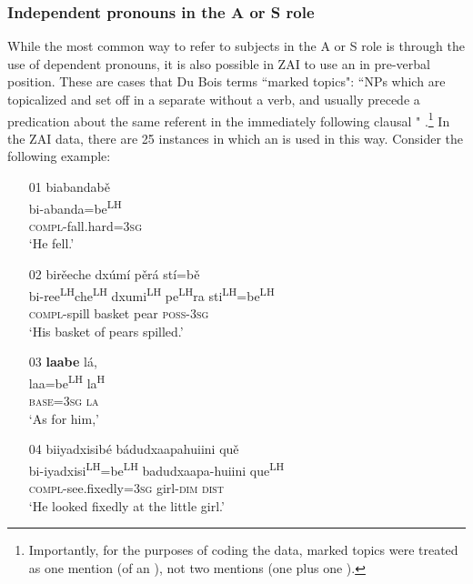 \subsubsection{Independent pronouns in the A or S role}\label{markedtopics}

While the most common way to refer to subjects in the A or S role is through the use of dependent pronouns, it is also possible in ZAI to use an  in pre-verbal position. These are cases that Du Bois terms ``marked topics": ``NPs which are topicalized and set off in a separate  without a verb, and usually precede a predication about the same referent in the immediately following clausal " \citep[814, note 11]{dubois1987}.\footnote{Importantly, for the purposes of coding the data, marked topics were treated as one mention (of an ), not two mentions (one  plus one ).} In the ZAI data, there are 25 instances in which an  is used in this way. Consider the following example: 

\ea\label{markedIPR1}
\begin{itemize}
\item[01]
\glll biabandab\v{e} \\
bi-abanda=be\textsuperscript{LH} \\
\textsc{compl}-fall.hard=3\textsc{sg} \\
\glt `He fell.'


\item[02]
\glll bir\v{e}eche dx\'{u}m\'{i} p\v{e}r\'{a} st\'{i}=b\v{e} \\
bi-ree\textsuperscript{LH}che\textsuperscript{LH} dxumi\textsuperscript{LH} pe\textsuperscript{LH}ra sti\textsuperscript{LH}=be\textsuperscript{LH} \\
\textsc{compl}-spill basket pear \textsc{poss}-3\textsc{sg} \\
\glt `His basket of pears spilled.'


\item[03]
\glll \textbf{laabe} l\'{a}, \\
laa=be\textsuperscript{LH} la\textsuperscript{H} \\
\textsc{base}=3\textsc{sg} \textsc{la} \\
\glt `As for him,'


\item[04]
\glll biiyadxisib\'{e} b\'{a}dudxaapahuiini qu\v{e} \\
bi-iyadxisi\textsuperscript{LH}=be\textsuperscript{LH} badudxaapa-huiini que\textsuperscript{LH} \\
\textsc{compl}-see.fixedly=3\textsc{sg} girl-\textsc{dim} \textsc{dist} \\
\glt `He looked fixedly at the little girl.'
\end{itemize}
\z

